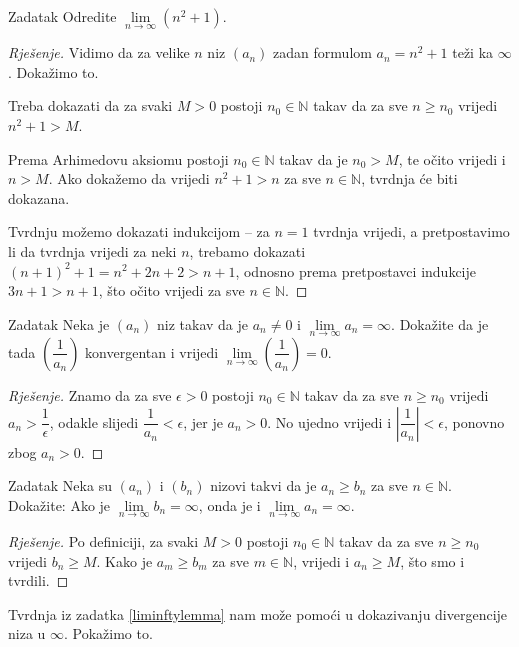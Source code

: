 \begin{exercise}{Zadatak}
Odredite \(\lim\limits_{n\to \infty} \left(n^2+1\right)\).
\end{exercise}
\begin{proof}[Rješenje]
Vidimo da za velike \(n\) niz \((a_n)\) zadan formulom \(a_n=n^2+1\) teži ka \(\infty\). Dokažimo to. 

Treba dokazati da za svaki \(M>0\) postoji \(n_0\in \mathbb{N}\) takav da za sve \(n\geq n_0\) vrijedi \(n^2+1>M\). 

Prema Arhimedovu aksiomu postoji \(n_0\in \mathbb{N}\) takav da je \(n_0>M\), te očito vrijedi i \(n>M\). Ako dokažemo da vrijedi \(n^2+1>n\) za sve \(n\in \mathbb{N}\), tvrdnja će biti dokazana. 

Tvrdnju možemo dokazati indukcijom -- za \(n=1\) tvrdnja vrijedi, a pretpostavimo li da tvrdnja vrijedi za neki \(n\), trebamo dokazati \((n+1)^2+1=n^2+2n+2>n+1\), odnosno prema pretpostavci indukcije \(3n+1>n+1\), što očito vrijedi za sve \(n\in \mathbb{N}\).
\end{proof}
\begin{exercise}{Zadatak}
\label{6}
Neka je \((a_n)\) niz takav da je \(a_n\neq 0\) i \(\lim\limits_{n\to \infty}{a_n}=\infty\). Dokažite da je tada \(\left(\dfrac{1}{a_n}\right)\) konvergentan i vrijedi \(\lim\limits_{n\to \infty}\left(\dfrac{1}{a_n}\right)=0\).
\end{exercise}
\begin{proof}[Rješenje]
Znamo da za sve \(\epsilon>0\) postoji \(n_0\in \mathbb{N}\) takav da za sve \(n\geq n_0\) vrijedi \(a_n>\dfrac{1}{\epsilon}\), odakle slijedi \(\dfrac{1}{a_n}<\epsilon\), jer je \(a_n>0\). No ujedno vrijedi i \(\left\lvert \dfrac{1}{a_n}\right\rvert<\epsilon\), ponovno zbog \(a_n>0\).
\end{proof}
\begin{exercise}{Zadatak}
\label{liminftylemma}
Neka su \((a_n)\) i \((b_n)\) nizovi takvi da je \(a_n\geq b_n\) za sve \(n\in \mathbb{N}\). Dokažite: Ako je \(\lim\limits_{n\to \infty}{b_n}=\infty\), onda je i \(\lim\limits_{n\to \infty}{a_n}=\infty\).
\end{exercise}
\begin{proof}[Rješenje]
Po definiciji, za svaki \(M>0\) postoji \(n_0\in \mathbb{N}\) takav da za sve \(n\geq n_0\) vrijedi \(b_n\geq M\). Kako je \(a_m\geq b_m\) za sve \(m\in \mathbb{N}\), vrijedi i \(a_n\geq M\), što smo i tvrdili.
\end{proof}
Tvrdnja iz zadatka \ref{liminftylemma} nam može pomoći u dokazivanju divergencije niza u \(\infty\). Pokažimo to.
